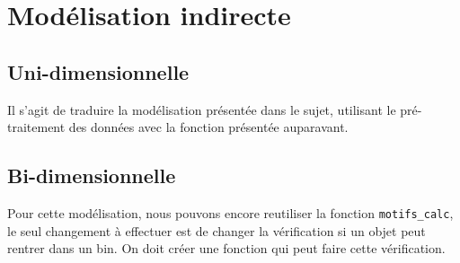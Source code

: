 \documentclass{article}
\begin{document}
\section{Modélisation indirecte}
    \subsection*{Uni-dimensionnelle}
        Il s'agit de traduire la modélisation présentée dans le sujet, utilisant le pré-traitement des données avec la fonction présentée auparavant.

    \subsection*{Bi-dimensionnelle}
        Pour cette modélisation, nous pouvons encore reutiliser la fonction  \texttt{motifs\_calc}, le seul changement à effectuer est de changer la vérification si un objet peut rentrer dans un bin. On doit créer une fonction qui peut faire cette vérification.
\end{document}
